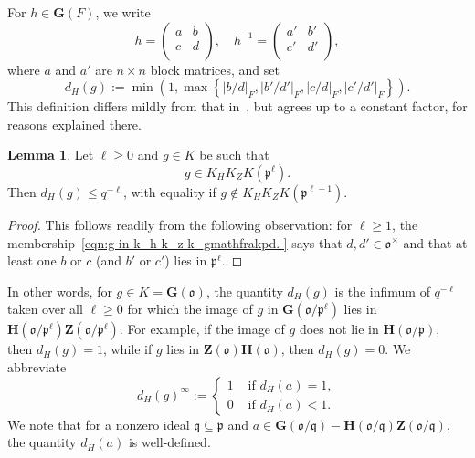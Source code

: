 \documentclass[reqno]{amsart}
\theoremstyle{plain} \newtheorem{theorem} {Theorem} \newtheorem{conjecture} {Conjecture} \newtheorem{corollary} [theorem] {Corollary} \newtheorem{proposition} [theorem] {Proposition} \newtheorem{fact} [theorem] {Fact}
\theoremstyle{definition} \newtheorem{definition} [theorem] {Definition}
\theoremstyle{itplain} %
\newtheorem{lemma}[theorem]{Lemma}
\newcommand{\mfq}{\mathfrak{q}}
\begin{document}
For $h \in \mathbf{G}(F)$, we write
\begin{equation*}
  h =
  \begin{pmatrix}
    a & b \\
    c & d \\
  \end{pmatrix},
  \quad
  h^{-1} =
  \begin{pmatrix}
    a' & b' \\
    c' & d' \\
  \end{pmatrix},
\end{equation*}
where $a$ and $a'$ are $n \times n$ block matrices, and set
\begin{equation*}
  d_H(g) := \min\left(1,
    \max
    \left\{
      \lvert b/d \rvert_F,
      \lvert b'/d' \rvert_F,
      \lvert c/d \rvert_F,
      \lvert c'/d' \rvert_F
    \right\}
  \right).
\end{equation*}
This definition differs mildly from that in~\cite[\S4.2]{2020arXiv201202187N}, but agrees up to a constant factor, for reasons explained there.

\begin{lemma}\label{lemma:let-d-geq-0-g-in-k_g-be-such-that-begin-g-in-k_h-k}
  Let ${\ell} \geq 0$ and $g \in K$ be such that
  \begin{equation}\label{eqn:g-in-k_h-k_z-k_gmathfrakpd.-}
    g \in K_H K_Z K(\mathfrak{p}^\ell).
  \end{equation}
  Then $d_H(g) \leq q^{-\ell}$, with equality if $g \notin K_H K_Z K(\mathfrak{p}^{\ell+1})$.
\end{lemma}
\begin{proof}
  This follows readily from the following observation: for $\ell \geq 1$, the membership~\eqref{eqn:g-in-k_h-k_z-k_gmathfrakpd.-} says that $d, d' \in \mathfrak{o}^\times$ and that at least one $b$ or $c$ (and $b'$ or $c'$) lies in $\mathfrak{p}^{\ell}$.
\end{proof}

In other words, for $g \in K = \mathbf{G}(\mathfrak{o})$, the quantity $d_H(g)$ is the infimum of $q^{-\ell}$ taken over all $\ell \geq 0$ for which the image of $g$ in $\mathbf{G}(\mathfrak{o}/\mathfrak{p}^{\ell})$ lies in $\mathbf{H}(\mathfrak{o}/\mathfrak{p}^{\ell})\mathbf{Z}(\mathfrak{o}/\mathfrak{p}^{\ell})$. For example, if the image of $g$ does not lie in $\mathbf{H} (\mathfrak{o}/\mathfrak{p}) $, then $d_H(g) = 1$, while if $g$ lies in $\mathbf{Z}(\mathfrak{o}) \mathbf{H}(\mathfrak{o})$, then $d_H(g) = 0$.  We abbreviate
\begin{equation*}
  {d_H(g)}^\infty :=
  \begin{cases}
    1 & \text{ if } d_H(a) = 1, \\
    0 &  \text{ if } d_H(a) < 1.
  \end{cases}
\end{equation*}
We note that for a nonzero ideal $\mfq \subseteq \mathfrak{p}$ and $a \in \mathbf{G}(\mathfrak{o}/\mfq) - \mathbf{H}(\mathfrak{o}/\mfq) \mathbf{Z}(\mathfrak{o}/\mfq)$, the quantity $d_H(a)$ is well-defined.
\end{document}
